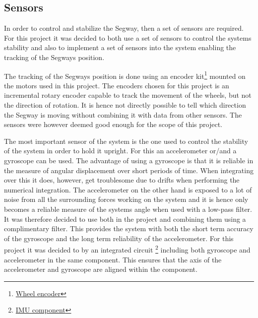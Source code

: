 
\subsection{Sensors}
In order to control and stabilize the Segway, then a set of sensors are required.
For this project it was decided to both use a set of sensors to control the systems stability and also to implement a set of sensors into the system enabling the tracking of the Segways position.


The tracking of the Segways position is done using an encoder kit\footnote{ \href{https://www.sparkfun.com/products/13339}{Wheel encoder}} mounted on the motors used in this project.
The encoders chosen for this project is an incremental rotary encoder capable to track the movement of the wheels, but not the direction of rotation.
It is hence not directly possible to tell which direction the Segway is moving without combining it with data from other sensors.
The sensors were however deemed good enough for the scope of this project.


The most important sensor of the system is the one used to control the stability of the system in order to hold it upright.
For this an accelerometer or/and a gyroscope can be used.
The advantage of using a gyroscope is that it is reliable in the measure of angular displacement over short periods of time.
When integrating over this it does, however, get troublesome due to drifts when performing the numerical integration.
The accelerometer on the other hand is exposed to a lot of noise from all the surrounding forces working on the system and it is hence only becomes a reliable measure of the systems angle when used with a low-pass filter.
It was therefore decided to use both in the project and combining them using a complimentary filter.
This provides the system with both the short term accuracy of the gyroscope and the long term reliability of the accelerometer.
For this project it was decided to by an integrated circuit
\footnote{ \href{https://www.sparkfun.com/products/13339}{IMU component}}
 including both gyroscope and accelerometer in the same component.
This ensures that the axis of the accelerometer and gyroscope are aligned within the component.



